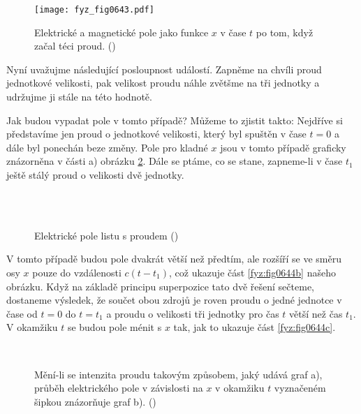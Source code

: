     \begin{figure}[ht!] %
      \centering
      \texttt{[image: fyz\_fig0643.pdf]}
      \caption{Elektrické a magnetické pole jako funkce \(x\) v čase \(t\) po tom, když začal téci
               proud. (\cite[s.~351]{Feynman02})}
      \label{fyz:fig0643}
    \end{figure}

    Nyní uvažujme následující posloupnost událostí. Zapněme na chvíli proud jednotkové velikosti,
    pak velikost proudu náhle zvětšme na tři jednotky a udržujme ji stále na této hodnotě.

    Jak budou vypadat pole v tomto případě? Můžeme to zjistit takto: Nejdříve si představíme jen
    proud o jednotkové velikosti, který byl spuštěn v čase \(t = 0\) a dále byl ponechán beze změny.
    Pole pro kladné \(x\) jsou v tomto případě graficky znázorněna v části a) obrázku
    \ref{fyz:fig0644}. Dále se ptáme, co se stane, zapneme-li v čase \(t_1\) ještě stálý proud o
    velikosti dvě jednotky.

    \begin{figure}[ht!]  %
      \centering
       \\
       \\
      \caption{Elektrické pole listu s proudem (\cite[s.~351]{Feynman02})}
      \label{fyz:fig0644}
    \end{figure}

    V tomto případě budou pole dvakrát větší než předtím, ale rozšíří se ve směru osy \(x\) pouze do
    vzdálenosti \(c(t - t_1)\), což ukazuje část \ref{fyz:fig0644b} našeho obrázku. Když na základě
    principu superpozice tato dvě řešení sečteme, dostaneme výsledek, že součet obou zdrojů je roven
    proudu o jedné jednotce v čase od \(t=0\) do \(t=t_1\) a proudu o velikosti tři jednotky pro čas
    \(t\) větší než čas \(t_1\). V okamžiku \(t\) se budou pole ménit s \(x\) tak, jak to ukazuje
    část \ref{fyz:fig0644c}.

    \begin{figure}[ht!]  %
      \centering
       \\
      \caption{Mění-li se intenzita proudu takovým způsobem, jaký udává graf a), průběh elektrického 
              pole v závislosti na \(x\) v okamžiku \(t\) vyznačeném šipkou znázorňuje graf b). 
              (\cite[s.~351]{Feynman02})}
      \label{fyz:fig0646}
    \end{figure}

